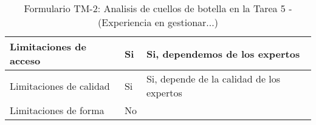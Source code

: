\begin{table}[H]
{\begin{tabular}{|l|l|l|}
		Limitaciones de acceso& \multicolumn{1}{p{1.0cm}|}{Si} & \multicolumn{1}{p{13.0cm}|}{Si, dependemos de los expertos}\\
		\hline

		Limitaciones de calidad& \multicolumn{1}{p{1.0cm}|}{Si} & \multicolumn{1}{p{13.0cm}|}{Si, depende de la calidad de los expertos}\\
		\hline

		Limitaciones de forma& \multicolumn{1}{p{1.0cm}|}{No} & \multicolumn{1}{p{13.0cm}|}{}\\
		\hline

	  \end{tabular}
	}
	\caption{\label{tab:TM2}Formulario TM-2: Analisis de cuellos de botella en la Tarea 5 - (Experiencia en gestionar...)}
  \end{table}

